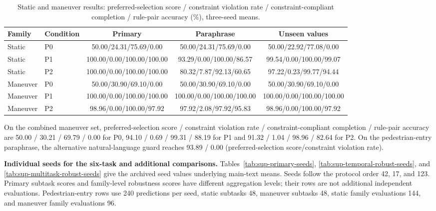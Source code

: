 \documentclass[10pt]{article}
\begin{document}
\begin{table}[h]
\centering\footnotesize
\caption{Static and maneuver results: preferred-selection score / constraint violation rate / constraint-compliant completion / rule-pair accuracy (\%), three-seed means.}
\label{tab:sup-static}
\scriptsize\setlength{\tabcolsep}{3pt}
\begin{tabular}{llccc}
\toprule
Family & Condition & Primary & Paraphrase & Unseen values\\
\midrule
Static & P0 & 50.00/24.31/75.69/0.00 & 50.00/24.31/75.69/0.00 & 50.00/22.92/77.08/0.00\\
Static & P1 & 100.00/0.00/100.00/100.00 & 93.29/0.00/100.00/86.57 & 99.54/0.00/100.00/99.07\\
Static & P2 & 100.00/0.00/100.00/100.00 & 80.32/7.87/92.13/60.65 & 97.22/0.23/99.77/94.44\\
Maneuver & P0 & 50.00/30.90/69.10/0.00 & 50.00/30.90/69.10/0.00 & 50.00/30.90/69.10/0.00\\
Maneuver & P1 & 100.00/0.00/100.00/100.00 & 100.00/0.00/100.00/100.00 & 100.00/0.00/100.00/100.00\\
Maneuver & P2 & 98.96/0.00/100.00/97.92 & 97.92/2.08/97.92/95.83 & 98.96/0.00/100.00/97.92\\
\bottomrule
\end{tabular}
\end{table}

On the combined maneuver set, preferred-selection score / constraint violation rate / constraint-compliant completion /
rule-pair accuracy are 50.00 / 30.21 / 69.79 / 0.00 for P0, 94.10 / 0.69 / 99.31 / 88.19
for P1 and 91.32 / 1.04 / 98.96 / 82.64 for P2. On the pedestrian-entry
paraphrase, the alternative natural-language guard reaches 93.89 / 0.00
(preferred-selection score/constraint violation rate).

\textbf{Individual seeds for the six-task and additional comparisons.}
Tables~\ref{tab:sup-primary-seeds}, \ref{tab:sup-temporal-robust-seeds}, and
\ref{tab:sup-multitask-robust-seeds} give the archived seed values underlying
main-text means. Seeds follow the protocol order 42, 17, and 123. Primary
subtask scores and family-level robustness scores have different aggregation
levels; their rows are not additional independent evaluations. Pedestrian-entry
rows use 240 predictions per seed, static subtasks 48, maneuver subtasks 48,
static family evaluations 144, and maneuver family evaluations 96.
\end{document}
